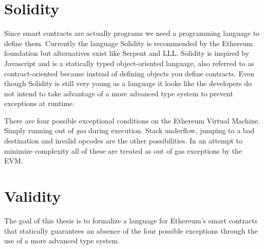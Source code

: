 \section{Solidity}

Since smart contracts are actually programs we need a programming language to
define them.
Currently the language Solidity is recommended by the Ethereum foundation but
alternatives exist like Serpent and LLL.
Solidity is inspired by Javascript and is a statically typed object-oriented
language, also referred to as contract-oriented because instead of defining
objects you define contracts.
Even though Solidity is still very young as a language it looks like the
developers do not intend to take advantage of a more advanced type system to
prevent exceptions at runtime.

There are four possible exceptional conditions on the Ethereum Virtual Machine.
Simply running out of \emph{gas} during execution.
Stack underflow, jumping to a bad destination and invalid opcodes are the other
possibilities.
In an attempt to minimize complexity all of these are treated as out of gas
exceptions by the EVM.

\section{Validity}

The goal of this thesis is to formalize a language for Ethereum's smart
contracts that statically guarantees an absence of the four possible exceptions
through the use of a more advanced type system.
